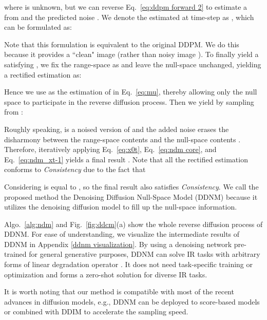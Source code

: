\documentclass{article} \usepackage{iclr2023_conference,times}
\begin{document}
where  is unknown, but we can reverse Eq.~\ref{eq:ddpm forward 2} to estimate a  from  and the predicted noise . We denote the estimated  at time-step  as , which can be formulated as:

Note that this formulation is equivalent to the original DDPM. We do this because it provides a ``clean" image  (rather than noisy image ). To finally yield a  satisfying , we fix the range-space as  and leave the null-space unchanged, yielding a rectified estimation  as: 

Hence we use  as the estimation of  in Eq.~\ref{eq:mu}, thereby allowing only the null space to participate in the reverse diffusion process. Then we yield  by sampling from :

Roughly speaking,  is a noised version of  and the added noise erases the disharmony between the range-space contents  and the null-space contents . Therefore, iteratively applying Eq.~\ref{eq:x0t}, Eq.~\ref{eq:ndm core}, and Eq.~\ref{eq:ndm_xt-1} yields a final result . Note that all the rectified estimation  conforms to \textit{Consistency} due to the fact that
 
Considering  is equal to , so the final result  also satisfies \textit{Consistency}. We call the proposed method the Denoising Diffusion Null-Space Model (DDNM) because it utilizes the denoising diffusion model to fill up the null-space information.

Algo.~\ref{alg:ndm} and Fig.~\ref{fig:ddcm}(a) show the whole reverse diffusion process of DDNM. For ease of understanding, we visualize the intermediate results of DDNM in Appendix \ref{ddnm visualization}. By using a denoising network  pre-trained for general generative purposes, DDNM can solve IR tasks with arbitrary forms of linear degradation operator . It does not need task-specific training or optimization and forms a zero-shot solution for diverse IR tasks. 

It is worth noting that our method is compatible with most of the recent advances in diffusion models, e.g., DDNM can be deployed to score-based models \citep{song2019generative,song2020score} or combined with DDIM \citep{song2021denoising} to accelerate the sampling speed.
\end{document}

